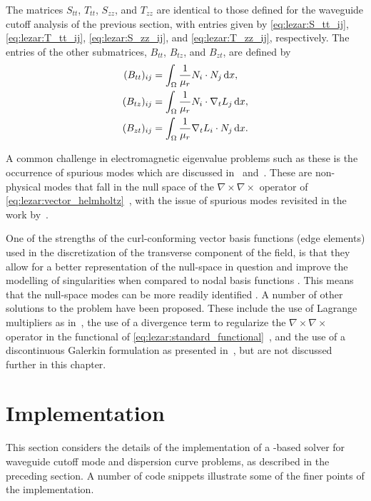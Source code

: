 The matrices $S_{tt}$, $T_{tt}$, $S_{zz}$, and $T_{zz}$ are identical to
those defined for the waveguide cutoff analysis of the previous section,
with entries given by \eqref{eq:lezar:S_tt_ij}, \eqref{eq:lezar:T_tt_ij},
\eqref{eq:lezar:S_zz_ij}, and \eqref{eq:lezar:T_zz_ij}, respectively. The
entries of the other submatrices, $B_{tt}$, $B_{tz}$, and $B_{zt}$,
are defined by
\begin{align}
\label{eq:lezar:B_tt_ij}
(B_{tt})_{ij} &=
\int_\Omega \frac{1}{\mu_r}{N}_i\cdot{N}_j \, \mathrm{d}x,\\
\label{eq:lezar:B_tz_ij}
(B_{tz})_{ij} &=
\int_\Omega \frac{1}{\mu_r}{N}_i\cdot\nabla_t{L_j} \, \mathrm{d}x,\\
\label{eq:lezar:B_zt_ij}
(B_{zt})_{ij} &=
\int_\Omega \frac{1}{\mu_r}\nabla_t{L_i}\cdot{N}_j \, \mathrm{d}x.
\end{align}

A common challenge in electromagnetic eigenvalue problems such as these is
the occurrence of spurious modes which are discussed in~\citet{Jin2002}
and~\citet{Davidson2011}. These are non-physical
modes that fall in the null space of the $\nabla\times{\nabla\times}$
operator of \eqref{eq:lezar:vector_helmholtz}~\citep{Bossavit1998},
with the issue of spurious modes revisited in the work
by~\citet{FernandesRaffetto2002}.

One of the strengths of the curl-conforming vector basis functions
(edge elements) used in the discretization of the transverse component
of the field, is that they allow for a better representation of the
null-space in question and improve the modelling of singularities when
compared to nodal basis functions \citep{Webb1993}. This means that the
null-space modes can be more readily identified \citep{Davidson2011,
Jin2002}. A number of other solutions to the problem have
been proposed. These include the use of Lagrange multipliers as
in~\citet{VardapetyanDemkowicz2002}, the use of a divergence term to
regularize the $\nabla\times{\nabla\times}$ operator in the functional
of \eqref{eq:lezar:standard_functional}~\citep{ConstableDauge2002},
and the use of a discontinuous Galerkin formulation as presented
in~\citet{BuffaHoustonPerugia2007}, but are not discussed further in
this chapter.

\section{Implementation}
\label{lezar:sec:Implementation}

This section considers the details of the implementation of a
\fenics-based solver for waveguide cutoff mode and dispersion
curve problems, as described in the preceding section.
A number of code snippets
illustrate some of the finer points of the implementation.

